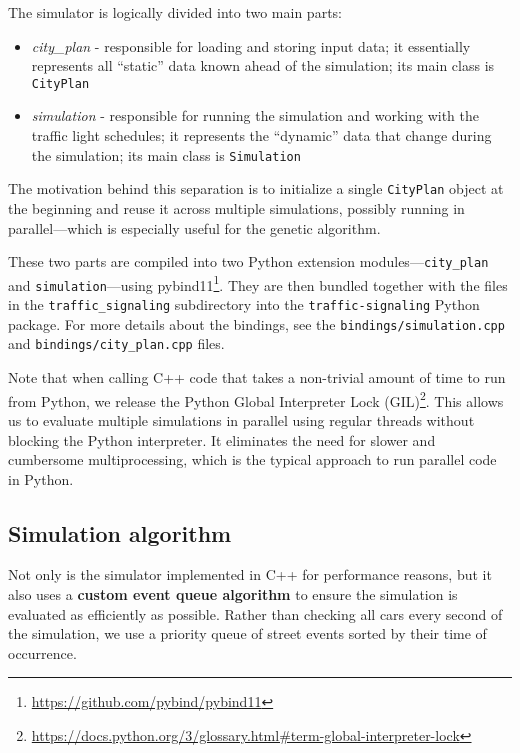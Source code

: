 \bigskip

The simulator is logically divided into two main parts:
\begin{itemize}
    \item \textit{city\_plan} - responsible for loading and storing input data; it essentially represents all ``static'' data known ahead of the simulation; its main class is \verb|CityPlan|
    \item \textit{simulation} - responsible for running the simulation and working with the traffic light schedules; it represents the ``dynamic'' data that change during the simulation; its main class is \verb|Simulation|
\end{itemize}

The motivation behind this separation is to initialize a single \verb|CityPlan| object at the beginning and reuse it across multiple simulations, possibly running in parallel---which is especially useful for the genetic algorithm.

\bigskip

These two parts are compiled into two Python extension modules---\verb|city_plan| and \verb|simulation|---using pybind11\footnote{\url{https://github.com/pybind/pybind11}}. They are then bundled together with the files in the \verb|traffic_signaling| subdirectory into the \verb|traffic-signaling| Python package. For more details about the bindings, see the \verb|bindings/simulation.cpp| and \verb|bindings/city_plan.cpp| files.

\bigskip

Note that when calling C++ code that takes a non-trivial amount of time to run from Python, we release the Python Global Interpreter Lock (GIL)\footnote{\url{https://docs.python.org/3/glossary.html\#term-global-interpreter-lock}}. This allows us to evaluate multiple simulations in parallel using regular threads without blocking the Python interpreter. It eliminates the need for slower and cumbersome multiprocessing, which is the typical approach to run parallel code in Python.

\subsection{Simulation algorithm}

Not only is the simulator implemented in C++ for performance reasons, but it also uses a \textbf{custom event queue algorithm} to ensure the simulation is evaluated as efficiently as possible. Rather than checking all cars every second of the simulation, we use a priority queue of street events sorted by their time of occurrence.

